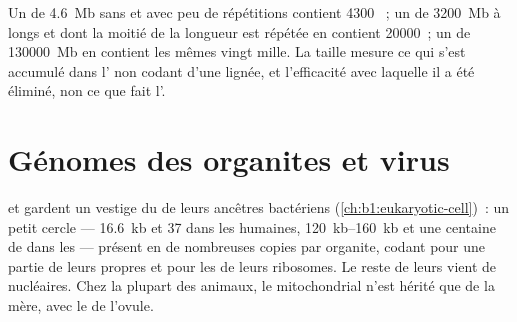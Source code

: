\begin{example}\label{ex:b1:genomes:sizes}
Un  de \qty{4.6}{Mb} sans  et avec peu de répétitions
contient \num{4300} ~; un de \qty{3200}{Mb} à longs  et dont
la moitié de la longueur est répétée en contient \num{20000}~; un de
\qty{130000}{Mb} en contient les mêmes vingt mille. La taille mesure ce
qui s'est accumulé dans l' non codant d'une lignée, et l'efficacité
avec laquelle il a été éliminé, non ce que fait l'.
\end{example}

\section{Génomes des organites et virus}

\begin{definition}\label{def:b1:genomes:organelle}
 et  gardent un vestige du  de leurs
ancêtres bactériens (\cref{ch:b1:eukaryotic-cell})~: un petit cercle ---
\qty{16.6}{kb} et 37  dans les  humaines,
\qtyrange{120}{160}{kb} et une centaine de  dans les 
--- présent en de nombreuses copies par organite, codant pour une partie
de leurs propres  et pour les  de leurs ribosomes. Le reste
de leurs  vient de  nucléaires. Chez la plupart des
animaux, le  mitochondrial n'est hérité que de la mère, avec le
 de l'ovule.
\end{definition}

